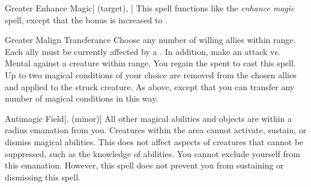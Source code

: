 \lowercase{\hypertarget{spell:Greater Enhance Magic}{}}\label{spell:Greater Enhance Magic}
\begin{attuneability}[\nth{4}]{\hypertarget{spell:Greater Enhance Magic}{Greater Enhance Magic}}[ (target), ]
This spell functions like the \textit{enhance magic} spell, except that the bonus is increased to .
\end{attuneability}
\vspace{0.25em}



\lowercase{\hypertarget{spell:Greater Malign Transferance}{}}\label{spell:Greater Malign Transferance}
\begin{apability}[\nth{5}]{\hypertarget{spell:Greater Malign Transferance}{Greater Malign Transferance}}
Choose any number of willing allies within \rngmed range.
Each ally must be currently affected by a  .
In addition, make an attack vs. Mental against a creature within \rngmed range.
\miss You regain the  spent to cast this spell.
\hit Up to two magical conditions of your choice are removed from the chosen allies and applied to the struck creature.
\crit As above, except that you can transfer any number of magical conditions in this way.
\end{apability}
\vspace{0.25em}



\lowercase{\hypertarget{spell:Antimagic Field}{}}\label{spell:Antimagic Field}
\begin{apability}[\nth{7}]{\hypertarget{spell:Antimagic Field}{Antimagic Field}}[,  (minor)]
All other magical abilities and objects are  within a \areamed radius emanation from you.
Creatures within the area cannot activate, sustain, or dismiss magical abilities.
This does not affect aspects of creatures that cannot be suppressed, such as the knowledge of abilities.
You cannot exclude yourself from this emanation.
However, this spell does not prevent you from sustaining or dismissing this spell.
\end{apability}
\vspace{0.25em}


